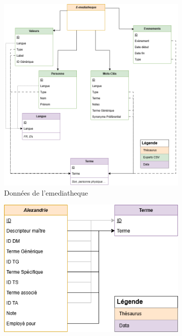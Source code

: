 \begin{figure}[htbp]
	\centering
	\begin{subfigure}{0.45\textwidth}
		\centering
		\includegraphics[width=\linewidth]{img/UML_emediatheque}
		\caption{Données de l'\gls{emediatheque}}
		\label{uml:emediatheque}
	\end{subfigure}
	\begin{subfigure}{0.45\textwidth}
		\centering
		\includegraphics[width=\linewidth]{img/UML_alexandrie}

\end{subfigure}
\end{figure}
